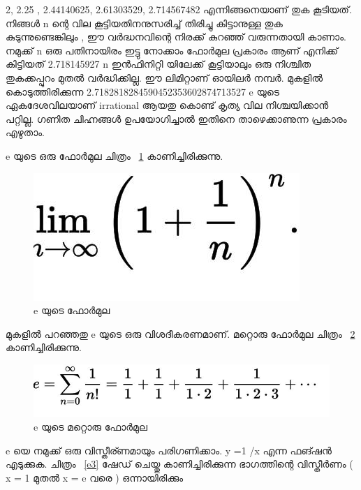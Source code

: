 \documentclass[10pt,a4paper]{report}
\begin{document}
  2, 2.25 , 2.44140625, 2.61303529, 2.714567482  എന്നിങ്ങനെയാണ് തുക കൂടിയത്. നിങ്ങൾ n ന്റെ വില  കൂട്ടിയതിനനുസരിച്ച് തിരിച്ചു കിട്ടാനുള്ള തുക കുടുന്നുണ്ടെങ്കിലും , ഈ  വർദ്ധനവിന്റെ നിരക്ക് കുറഞ്ഞ് വരുന്നതായി കാണാം.
നമുക്ക്  n ഒരു പതിനായിരം ഇട്ടു നോക്കാം ഫോർമുല പ്രകാരം ആണ് എനിക്ക് കിട്ടിയത്‌  2.718145927 n ഇൻഫിനിറ്റി യിലേക്ക്  കൂട്ടിയാലും ഒരു നിശ്ചിത തുകക്കപ്പുറം മുതൽ വർദ്ധിക്കില്ല. ഈ ലിമിറ്റാണ്  ഓയിലർ നമ്പർ. മുകളിൽ കൊടുത്തിരിക്കുന്ന 2.7182818284590452353602874713527 e  യുടെ ഏകദേശവിലയാണ്  irrational ആയതു കൊണ്ട് കൃത്യ വില നിശ്ചയിക്കാൻ പറ്റില്ല.  ഗണിത ചിഹ്നങ്ങൾ ഉപയോഗിച്ചാൽ ഇതിനെ താഴെക്കാണുന്ന പ്രകാരം എഴുതാം.

e യുടെ ഒരു ഫോർമുല ചിത്രം  ~\ref{e1}  കാണിച്ചിരിക്കുന്നു.
\begin{figure}
\center
\includegraphics[scale=.25]{images/e}
\caption{e യുടെ  ഫോർമുല }
\label{e1}
\end{figure}
മുകളിൽ  പറഞ്ഞതു e യുടെ ഒരു വിശദീകരണമാണ്. മറ്റൊരു ഫോർമുല ചിത്രം  ~\ref{e2} കാണിച്ചിരിക്കുന്നു.   
  
  \begin{figure}[H]
  \center
\includegraphics[scale=.25]{images/e1}
\caption{e യുടെ  മറ്റൊരു ഫോർമുല }
\label{e2}
\end{figure}
  
  e യെ നമുക്ക് ഒരു വിസ്തീര്ണമായും പരിഗണിക്കാം. y =1 /x  എന്ന ഫങ്ഷൻ   എടുക്കുക. ചിത്രം ~\ref{e3}   ഷേഡ്  ചെയ്തു കാണിച്ചിരിക്കുന്ന ഭാഗത്തിന്റെ വിസ്തീർണം  ( x = 1 മുതൽ  x = e  വരെ ) ഒന്നായിരിക്കും 
  
\end{document}
